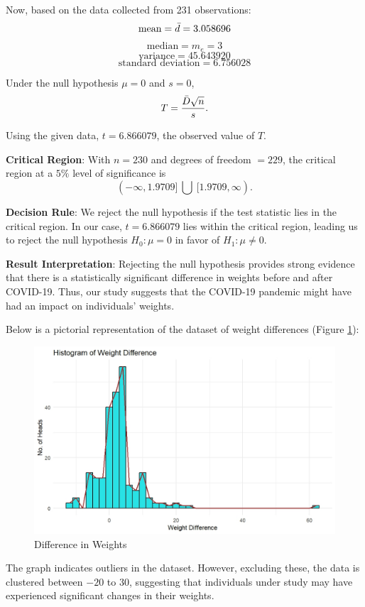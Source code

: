 Now, based on the data collected from 231 observations:
$$\text{mean} = \Bar{d} = 3.058696$$
$$\text{median} = m_{e} = 3$$
$$\text{variance} = 45.643920$$
$$\text{standard deviation} = 6.756028$$

Under the null hypothesis $\mu = 0$ and $s = 0$,
$$T = \frac{\Bar{D} \sqrt{n}}{s}.$$

Using the given data, $t = 6.866079$, the observed value of $T$.

\textbf{Critical Region}:
With $n = 230$ and degrees of freedom $= 229$, the critical region at a $5\%$ level of significance is
$$(-\infty , 1.9709] \ \bigcup \ [1.9709, \infty).$$

\textbf{Decision Rule}:
We reject the null hypothesis if the test statistic lies in the critical region. In our case, $t = 6.866079$ lies within the critical region, leading us to reject the null hypothesis $H_{0} : \mu = 0$ in favor of $H_{1} : \mu \neq 0$.

\textbf{Result Interpretation}:
Rejecting the null hypothesis provides strong evidence that there is a statistically significant difference in weights before and after COVID-19. Thus, our study suggests that the COVID-19 pandemic might have had an impact on individuals' weights.

Below is a pictorial representation of the dataset of weight differences (Figure \ref{G39}):

\begin{figure}[h!]
    \centering
    \includegraphics[width=0.7\linewidth]{IMAGES/Image 39.jpg}
    \caption{Difference in Weights}
    \label{G39}
\end{figure}

The graph indicates outliers in the dataset. However, excluding these, the data is clustered between $-20$ to $30$, suggesting that individuals under study may have experienced significant changes in their weights.
